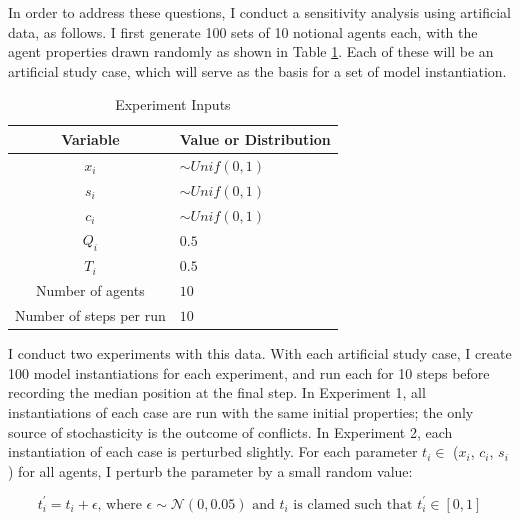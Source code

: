 In order to address these questions, I conduct a sensitivity analysis using artificial data, as follows. I first generate 100 sets of 10 notional agents each, with the agent properties drawn randomly as shown in Table \ref{table:sa_params}. Each of these will be an artificial study case, which will serve as the basis for a set of model instantiation. 

\begin{table}
\centering
\caption{Experiment Inputs}
\label{table:sa_params}
\begin{tabular}{cl}
    \hline
    Variable &  Value or Distribution\\
    \hline
    $x_i$            &        $\sim Unif(0, 1)$  \\
    $s_i$            &        $\sim Unif(0, 1)$          \\
    $c_i$            &        $\sim Unif(0, 1)$        \\
    $Q_i$            &   $0.5$ \\
    $T_i$            &   $0.5$ \\
    \hline
    Number of agents &        $10$ \\
    Number of steps per run &        $10$ \\
    \hline
\end{tabular}
\tableSpace
\end{table}

I conduct two experiments with this data. With each artificial study case, I create 100 model instantiations for each experiment, and run each for 10 steps before recording the median position at the final step. In Experiment 1, all instantiations of each case are run with the same initial properties; the only source of stochasticity is the outcome of conflicts. In Experiment 2, each instantiation of each case is perturbed slightly. For each parameter $t_i \in$ ($x_i$, $c_i$, $s_i$) for all agents, I perturb the parameter by a small random value:

\begin{equation}
    t_i^\prime = t_i + \epsilon \text{, where } \epsilon \sim \mathcal{N}(0,0.05) \text{ and } t_i \text{ is clamed such that } t_i^\prime \in {[0,1]} 
\end{equation}

